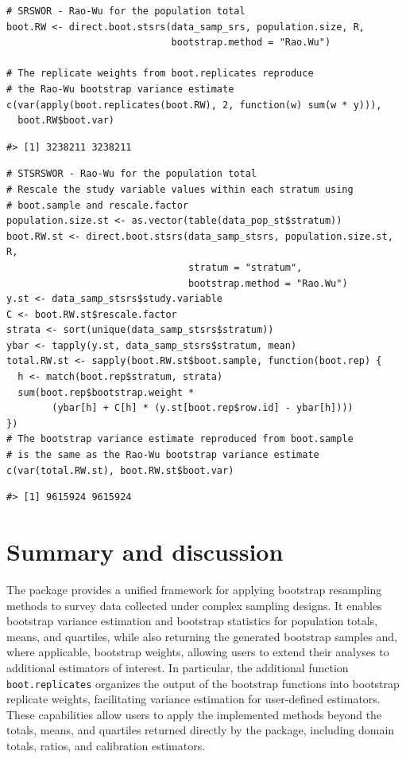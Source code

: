 \begin{verbatim}
# SRSWOR - Rao-Wu for the population total
boot.RW <- direct.boot.stsrs(data_samp_srs, population.size, R,
                             bootstrap.method = "Rao.Wu")

# The replicate weights from boot.replicates reproduce 
# the Rao-Wu bootstrap variance estimate
c(var(apply(boot.replicates(boot.RW), 2, function(w) sum(w * y))),
  boot.RW$boot.var)
\end{verbatim}

\begin{verbatim}
#> [1] 3238211 3238211
\end{verbatim}

\begin{verbatim}
# STSRSWOR - Rao-Wu for the population total
# Rescale the study variable values within each stratum using 
# boot.sample and rescale.factor
population.size.st <- as.vector(table(data_pop_st$stratum))
boot.RW.st <- direct.boot.stsrs(data_samp_stsrs, population.size.st, R,
                                stratum = "stratum",
                                bootstrap.method = "Rao.Wu")
y.st <- data_samp_stsrs$study.variable
C <- boot.RW.st$rescale.factor
strata <- sort(unique(data_samp_stsrs$stratum))
ybar <- tapply(y.st, data_samp_stsrs$stratum, mean)
total.RW.st <- sapply(boot.RW.st$boot.sample, function(boot.rep) {
  h <- match(boot.rep$stratum, strata)
  sum(boot.rep$bootstrap.weight *
        (ybar[h] + C[h] * (y.st[boot.rep$row.id] - ybar[h])))
})
# The bootstrap variance estimate reproduced from boot.sample
# is the same as the Rao-Wu bootstrap variance estimate
c(var(total.RW.st), boot.RW.st$boot.var)
\end{verbatim}

\begin{verbatim}
#> [1] 9615924 9615924
\end{verbatim}

\section{Summary and discussion}\label{sec:discussion}

The  package provides a unified framework for applying bootstrap resampling methods to survey data collected under complex sampling designs. It enables bootstrap variance estimation and bootstrap statistics for population totals, means, and quartiles, while also returning the generated bootstrap samples and, where applicable, bootstrap weights, allowing users to extend their analyses to additional estimators of interest. In particular, the additional function \texttt{boot.replicates} organizes the output of the bootstrap functions into bootstrap replicate weights, facilitating variance estimation for user-defined estimators. These capabilities allow users to apply the implemented methods beyond the totals, means, and quartiles returned directly by the package, including domain totals, ratios, and calibration estimators.

